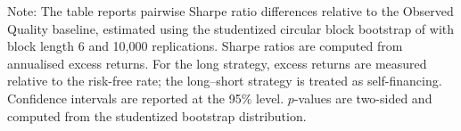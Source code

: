 \begin{table}[H]
\begin{threeparttable}
\begin{tablenotes}[flushleft]
\scriptsize
\item Note: The table reports pairwise Sharpe ratio differences relative to the Observed Quality baseline, estimated using the studentized circular block bootstrap of \textcite{ledoit2008} with block length 6 and 10,000 replications. Sharpe ratios are computed from annualised excess returns. For the long strategy, excess returns are measured relative to the risk-free rate; the long--short strategy is treated as self-financing. Confidence intervals are reported at the 95\% level. $p$-values are two-sided and computed from the studentized bootstrap distribution.
\end{tablenotes}
\end{threeparttable}
\end{table}
